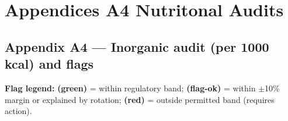 \newpage
\appendix

\section*{Appendices A4 Nutritonal Audits}

\subsection*{Appendix A4 --- Inorganic audit (per 1000 kcal) and flags}
\textbf{Flag legend:} \textbf{ 
 (green)} = within regulatory band; \textbf{ 
 (flag-ok)} = within $\pm$10\% margin or explained by rotation; \textbf{ 
 (red)} = outside permitted band (requires action).

